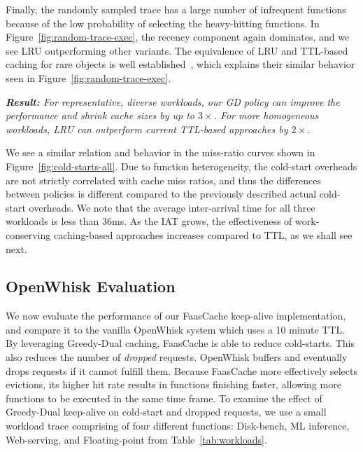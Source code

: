 Finally, the randomly sampled trace has a large number of infrequent functions because of the low probability of selecting the heavy-hitting functions.
In Figure~\ref{fig:random-trace-exec}, the recency component again dominates, and we see LRU outperforming other variants. 
The equivalence of LRU and TTL-based caching for rare objects is well established~\cite{basu2017adaptive,jiang2018convergence}, which explains their similar behavior seen in Figure~\ref{fig:random-trace-exec}. 

\noindent \emph{\textbf{Result:} For representative, diverse workloads, our GD policy can improve the performance and shrink cache sizes by up to $3\times$. For more homogeneous workloads, LRU can outperform current TTL-based approaches by $2\times$.}

We see a similar relation and behavior in the miss-ratio curves shown in Figure~\ref{fig:cold-starts-all}.
Due to function heterogeneity, the cold-start overheads are not strictly correlated with cache miss ratios, and thus the differences between policies is different compared to the previously described actual cold-start overheads. 
We note that the average inter-arrival time for all three workloads is less than 36ms. As the IAT grows, the effectiveness of work-conserving caching-based approaches increases compared to TTL, as we shall see next. 

\subsection{OpenWhisk Evaluation}
\vspace*{\subsecspace}

We now evaluate the performance of our FaasCache keep-alive implementation, and compare it to the vanilla OpenWhisk system which uses a 10 minute TTL. 
By leveraging Greedy-Dual caching, FaasCache is able to reduce cold-starts. 
This also reduces the number of \emph{dropped} requests. %
OpenWhisk buffers and eventually drops requests if it cannot fulfill them.
Because FaasCache more effectively selects evictions, its higher hit rate results in functions finishing faster, allowing more functions to be executed in the same time frame.  
%
To examine the effect of Greedy-Dual keep-alive on cold-start and dropped requests, we use a small workload trace comprising of four different functions: Disk-bench, ML inference, Web-serving, and Floating-point from Table~\ref{tab:workloads}.

